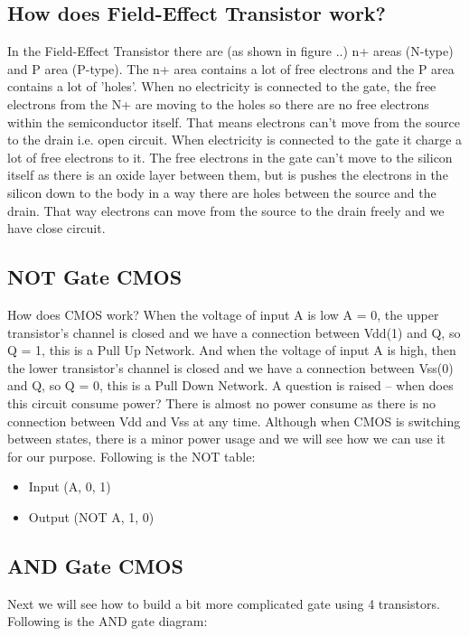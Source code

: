 \subsection{ How does Field-Effect Transistor work? }
In the Field-Effect Transistor there are (as shown in figure ..) n+ areas (N-type) and P area (P-type). The n+ area contains a lot of free electrons and the P area contains a lot of 'holes'. When no electricity is connected to the gate, the free electrons from the N+ are moving to the holes so there are no free electrons within the semiconductor itself. That means electrons can't move from the source to the drain i.e. open circuit. When electricity is connected to the gate it charge a lot of free electrons to it. The free electrons in the gate can't move to the silicon itself as there is an oxide layer between them, but is pushes the electrons in the silicon down to the body in a way there are holes between the source and the drain. That way electrons can move from the source to the drain freely and we have close circuit. 
\subsection{ NOT Gate CMOS}

How does CMOS work? When the voltage of input A is low A = 0, the upper transistor's channel is closed and we have a connection between Vdd(1) and Q, so Q = 1, this is a Pull Up Network. And when the voltage of input A is high, then the lower transistor's channel is closed and we have a connection between Vss(0) and Q, so Q = 0, this is a Pull Down Network.
A question is raised – when does this circuit consume power? There is almost no power consume as there is no connection between Vdd and Vss at any time. Although when CMOS is switching between states, there is a minor power usage and we will see how we can use it for our purpose.
Following is the NOT table:
\begin{itemize}
\item Input (A, 0, 1)
    	\item Output (NOT A, 1, 0)
\end{itemize}

\subsection{ AND Gate CMOS}
Next we will see how to build a bit more complicated gate using 4 transistors. Following is the AND gate diagram:

